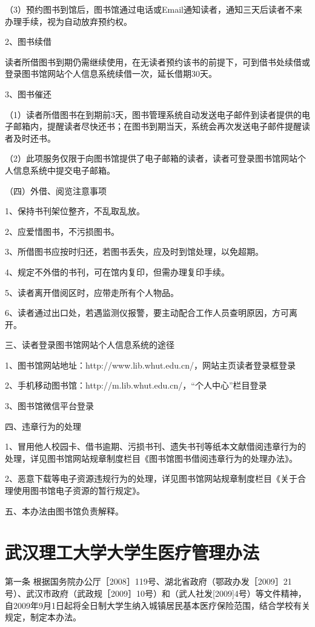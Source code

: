 \documentclass[UTF8,12pt,a4paper]{report}
\begin{document}
（3）预约图书到馆后，图书馆通过电话或Email通知读者，通知三天后读者不来办理手续，视为自动放弃预约权。

2、图书续借

读者所借图书到期仍需继续使用，在无读者预约该书的前提下，可到借书处续借或登录图书馆网站个人信息系统续借一次，延长借期30天。

3、图书催还

（1）读者所借图书在到期前3天，图书管理系统自动发送电子邮件到读者提供的电子邮箱内，提醒读者尽快还书；在图书到期当天，系统会再次发送电子邮件提醒读者及时还书。

（2）此项服务仅限于向图书馆提供了电子邮箱的读者，读者可登录图书馆网站个人信息系统中提交电子邮箱。

（四）外借、阅览注意事项

1、保持书刊架位整齐，不乱取乱放。

2、应爱惜图书，不污损图书。

3、所借图书应按时归还，若图书丢失，应及时到馆处理，以免超期。

4、规定不外借的书刊，可在馆内复印，但需办理复印手续。

5、读者离开借阅区时，应带走所有个人物品。

6、读者通过出口处，若遇监测仪报警，要主动配合工作人员查明原因，方可离开。

三、读者登录图书馆网站个人信息系统的途径

1、图书馆网站地址：http://www.lib.whut.edu.cn/，网站主页读者登录框登录

2、手机移动图书馆：http://m.lib.whut.edu.cn/，“个人中心”栏目登录

3、图书馆微信平台登录

四、违章行为的处理

1、冒用他人校园卡、借书逾期、污损书刊、遗失书刊等纸本文献借阅违章行为的处理，详见图书馆网站规章制度栏目《图书馆图书借阅违章行为的处理办法》。

2、恶意下载等电子资源违规行为的处理，详见图书馆网站规章制度栏目《关于合理使用图书馆电子资源的暂行规定》。

五、本办法由图书馆负责解释。

\chapter{武汉理工大学大学生医疗管理办法}
第一条 根据国务院办公厅［2008］119号、湖北省政府（鄂政办发［2009］21号）、武汉市政府（武政规［2009］10号）和（武人社发[2009]4号）等文件精神，自2009年9月1日起将全日制大学生纳入城镇居民基本医疗保险范围，结合学校有关规定，制定本办法。
\end{document}
